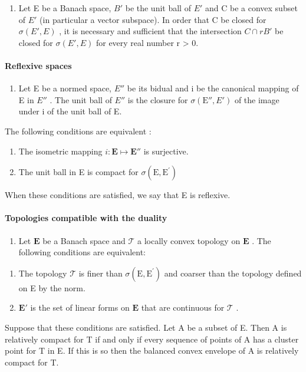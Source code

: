 \begin{enumerate}
\def\labelenumi{\arabic{enumi})}
\setcounter{enumi}{20}
\tightlist
\item
  Let E be a Banach space, \(B'\) be the unit ball of \(E'\) and C be a convex subset of \(E'\) (in particular a vector subspace). In order that C be closed for \(\sigma(E', E)\) , it is necessary and sufficient that the intersection \(C \cap rB'\) be closed for \(\sigma(E', E)\) for every real number r \textgreater{} 0.
\end{enumerate}

\paragraph{Reflexive spaces}

\begin{enumerate}
\def\labelenumi{\arabic{enumi})}
\setcounter{enumi}{21}
\tightlist
\item
   Let E be a normed space, \(E''\) be its bidual and i be the canonical mapping of E in \(E''\) . The unit ball of \(E''\) is the closure for \(\sigma(\mathrm{E}'', E')\) of the image under i of the unit ball of E.
\end{enumerate}

The following conditions are equivalent :

\begin{enumerate}
\def\labelenumi{(\roman{enumi})}
\item
  The isometric mapping \(i:\mathbf{E}\mapsto \mathbf{E}''\) is surjective.
\item
  The unit ball in E is compact for \(\sigma (\mathrm{E},\mathrm{E}^{\prime})\)
\end{enumerate}

When these conditions are satisfied, we say that E is reflexive.

\paragraph{Topologies compatible with the duality}

\begin{enumerate}
\def\labelenumi{\arabic{enumi})}
\setcounter{enumi}{22}
\tightlist
\item
  Let \(\mathbf{E}\) be a Banach space and \(\mathcal{T}\) a locally convex topology on \(\mathbf{E}\) . The following conditions are equivalent:
\end{enumerate}

\begin{enumerate}
\def\labelenumi{(\roman{enumi})}
\item
  The topology \(\mathcal{T}\) is finer than \(\sigma (\mathrm{E},\mathrm{E}^{\prime})\) and coarser than the topology defined on E by the norm.
\item
  \(\mathbf{E}'\) is the set of linear forms on \(\mathbf{E}\) that are continuous for \(\mathcal{T}\) .
\end{enumerate}

Suppose that these conditions are satisfied. Let A be a subset of E. Then A is relatively compact for T if and only if every sequence of points of A has a cluster point for T in E. If this is so then the balanced convex envelope of A is relatively compact for T.

